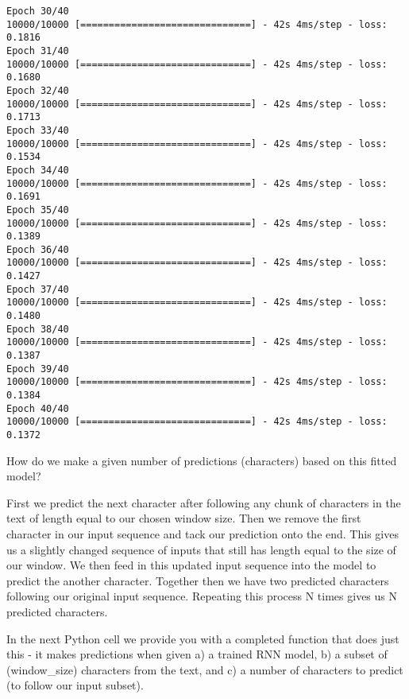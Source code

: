 \documentclass[11pt]{article}
\begin{document}
\begin{Verbatim}[commandchars=\\\{\}]
Epoch 30/40
10000/10000 [==============================] - 42s 4ms/step - loss: 0.1816
Epoch 31/40
10000/10000 [==============================] - 42s 4ms/step - loss: 0.1680
Epoch 32/40
10000/10000 [==============================] - 42s 4ms/step - loss: 0.1713
Epoch 33/40
10000/10000 [==============================] - 42s 4ms/step - loss: 0.1534
Epoch 34/40
10000/10000 [==============================] - 42s 4ms/step - loss: 0.1691
Epoch 35/40
10000/10000 [==============================] - 42s 4ms/step - loss: 0.1389
Epoch 36/40
10000/10000 [==============================] - 42s 4ms/step - loss: 0.1427
Epoch 37/40
10000/10000 [==============================] - 42s 4ms/step - loss: 0.1480
Epoch 38/40
10000/10000 [==============================] - 42s 4ms/step - loss: 0.1387
Epoch 39/40
10000/10000 [==============================] - 42s 4ms/step - loss: 0.1384
Epoch 40/40
10000/10000 [==============================] - 42s 4ms/step - loss: 0.1372

    \end{Verbatim}

    How do we make a given number of predictions (characters) based on this
fitted model?

First we predict the next character after following any chunk of
characters in the text of length equal to our chosen window size. Then
we remove the first character in our input sequence and tack our
prediction onto the end. This gives us a slightly changed sequence of
inputs that still has length equal to the size of our window. We then
feed in this updated input sequence into the model to predict the
another character. Together then we have two predicted characters
following our original input sequence. Repeating this process N times
gives us N predicted characters.

In the next Python cell we provide you with a completed function that
does just this - it makes predictions when given a) a trained RNN model,
b) a subset of (window\_size) characters from the text, and c) a number
of characters to predict (to follow our input subset).
\end{document}
